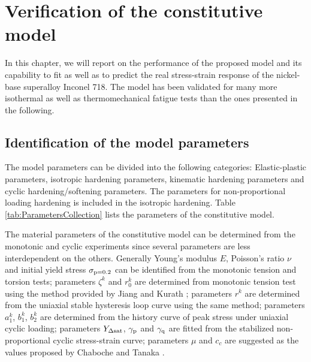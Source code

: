 \chapter{Verification of the constitutive model}
\noindent
In this chapter, we will report on the performance of the proposed model and its capability to fit as well as to predict the real stress-strain response of the nickel-base superalloy Inconel 718.
The model has been validated for many more isothermal as well as thermomechanical fatigue tests than the ones presented in the following.

\section{Identification of the model parameters}
\noindent
The model parameters can be divided into the following categories: Elastic-plastic parameters, isotropic hardening parameters, kinematic hardening parameters and cyclic hardening/softening parameters. The parameters for non-proportional loading hardening is included in the isotropic hardening.
Table \ref{tab:ParametersCollection} lists the parameters of the constitutive model.

The material parameters of the constitutive model can be determined from the monotonic and cyclic experiments since several parameters are less interdependent on the others.
Generally Young's modulus $E$, Poisson's ratio $\nu$ and initial yield stress $\sigma_{\rm p=0.2}$ can be identified from the monotonic tension and torsion tests;
parameters $\zeta^k$ and $r_0^k$ are determined from monotonic tension test using the method provided by Jiang and Kurath \cite{Jiang1996387};
parameters $r^k$ are determined from the uniaxial stable hysteresis loop curve using the same method;
parameters $a_1^k$, $b_1^k$, $b_2^k$ are determined from the history curve of peak stress under uniaxial cyclic loading;
parameters $Y_{\Delta \rm{sat}}$, $\gamma_{\rm{p}}$ and $\gamma_{\rm{q}}$ are fitted from the stabilized non-proportional cyclic stress-strain curve;
parameters $\mu$ and $c_c$ are suggested as the values proposed by Chaboche \cite{Chaboche1986149} and Tanaka \cite{tanaka1994nonproportionality}.

